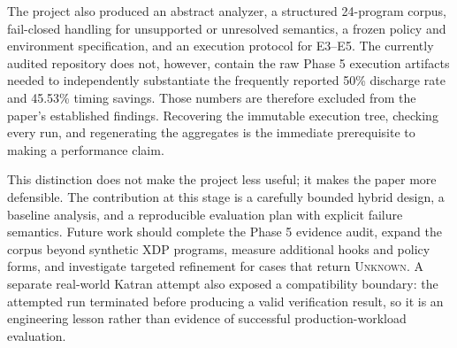 \documentclass[12pt,a4paper]{article}
\newcommand{\unknown}{\textsc{Unknown}}
\begin{document}
The project also produced an abstract analyzer, a structured 24-program corpus, fail-closed handling for unsupported or unresolved semantics, a frozen policy and environment specification, and an execution protocol for E3--E5. The currently audited repository does not, however, contain the raw Phase 5 execution artifacts needed to independently substantiate the frequently reported 50\% discharge rate and 45.53\% timing savings. Those numbers are therefore excluded from the paper's established findings. Recovering the immutable execution tree, checking every run, and regenerating the aggregates is the immediate prerequisite to making a performance claim.

This distinction does not make the project less useful; it makes the paper more defensible. The contribution at this stage is a carefully bounded hybrid design, a baseline analysis, and a reproducible evaluation plan with explicit failure semantics. Future work should complete the Phase 5 evidence audit, expand the corpus beyond synthetic XDP programs, measure additional hooks and policy forms, and investigate targeted refinement for cases that return \unknown. A separate real-world Katran attempt also exposed a compatibility boundary: the attempted run terminated before producing a valid verification result, so it is an engineering lesson rather than evidence of successful production-workload evaluation.



\end{document}
